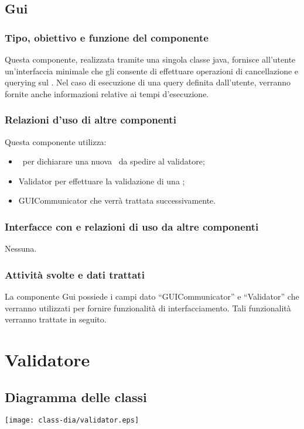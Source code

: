 \subsection{Gui}
\subsubsection{Tipo, obiettivo e funzione del componente}
Questa componente, realizzata tramite una singola classe java, fornisce all'utente un'interfaccia minimale che gli consente di effettuare operazioni di cancellazione e querying sul \rp. Nel caso di esecuzione di una query definita dall'utente, verranno fornite anche informazioni relative ai tempi d'esecuzione.
\subsubsection{Relazioni d'uso di altre componenti}
Questa componente utilizza:
\begin{itemize}
 \item \BR\ per dichiarare una nuova \br\ da spedire al validatore;
 \item Validator per effettuare la validazione di una \br;
 \item GUICommunicator che verr\`a trattata successivamente.
\end{itemize}
\subsubsection{Interfacce con e relazioni di uso da altre componenti}
Nessuna.
\subsubsection{Attivit\`a svolte e dati trattati}
La componente Gui possiede i campi dato ``GUICommunicator'' e ``Validator'' che verranno utilizzati per fornire funzionalit\`a di interfacciamento. Tali funzionalit\`a verranno trattate in seguito.

\section{Validatore}
\subsection{Diagramma delle classi}
\begin{center}
\texttt{[image: class-dia/validator.eps]}
\end{center}
